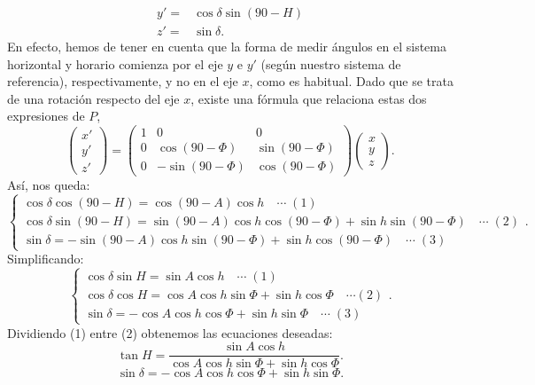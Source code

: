 \documentclass{article}
\begin{document}
\begin{sol}
\begin{description}
\[\begin{split}
	y' = & \cos \delta \sin\left(90 - H\right) \\
	z' = & \sin \delta.
\end{split}
\]
 En efecto, hemos de tener en cuenta que la forma de medir ángulos en el sistema horizontal y horario comienza por el eje $\displaystyle y $ e $\displaystyle y' $ (según nuestro sistema de referencia), respectivamente, y no en el eje $\displaystyle x $, como es habitual. Dado que se trata de una rotación respecto del eje $\displaystyle  x$, existe una fórmula que relaciona estas dos expresiones de $\displaystyle P $,
		\[ \begin{pmatrix} x' \\ y' \\ z' \end{pmatrix} = \begin{pmatrix} 1 & 0 & 0 \\
	0 & \cos \left(90 - \Phi\right) & \sin\left(90 - \Phi\right) \\
0 & - \sin\left(90-\Phi\right) & \cos\left(90-\Phi\right)\end{pmatrix}\begin{pmatrix} x \\ y \\z \end{pmatrix} .\]
Así, nos queda:
\[
\begin{cases}
\cos \delta \cos \left(90-H\right) = \cos\left(90-A\right)\cos h \quad \cdots \; \left(1\right)\\
\cos \delta\sin\left(90-H\right)= \sin\left(90-A\right)\cos h \cos \left(90-\Phi\right) + \sin h \sin\left(90-\Phi\right) \quad \cdots \; \left(2\right)\\
\sin \delta = - \sin\left(90-A\right)\cos h \sin\left(90-\Phi\right) + \sin h \cos\left(90-\Phi\right) \quad \cdots \; \left(3\right)
\end{cases}
.\]
Simplificando:
\[
\begin{cases}
\cos\delta \sin H = \sin A \cos h \quad \cdots \; \left(1\right) \\
\cos \delta \cos H = \cos A \cos h \sin \Phi + \sin h \cos \Phi \quad \cdots \left(2\right)\\
\sin \delta = - \cos A\cos h \cos \Phi + \sin h \sin \Phi \quad \cdots \; \left(3\right)
\end{cases}
.\]
Dividiendo (1) entre (2) obtenemos las ecuaciones deseadas:
\[ \tan H = \frac{\sin A \cos h}{\cos A \cos h \sin \Phi + \sin h \cos \Phi}.\]
\[\sin \delta = - \cos A \cos h\cos \Phi + \sin h \sin \Phi .\]
\end{description}
\end{sol}
\end{document}
